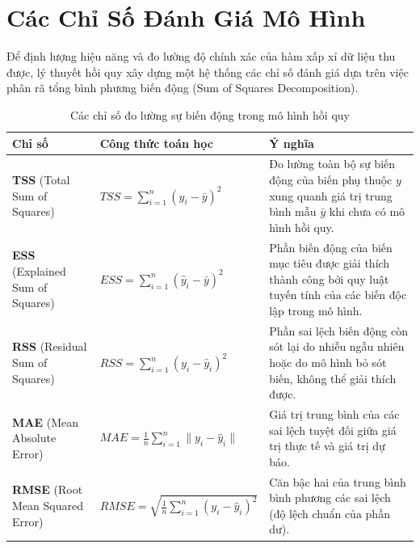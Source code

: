 \section{Các Chỉ Số Đánh Giá Mô Hình}

Để định lượng hiệu năng và đo lường độ chính xác của hàm xấp xỉ dữ liệu thu được, lý thuyết hồi quy xây dựng một hệ thống các chỉ số đánh giá dựa trên việc phân rã tổng bình phương biến động (Sum of Squares Decomposition).


\begin{table}[H]
    \centering
    \renewcommand{\arraystretch}{1.5}
    \setlength{\tabcolsep}{8pt}
    
    \begin{tabular}{|p{3.5cm}|p{5.5cm}|p{6cm}|}
        \hline
        \rowcolor[rgb]{0.8, 0.9, 1.0}
        \textbf{Chỉ số} & \textbf{Công thức toán học} & \textbf{Ý nghĩa} \\ \hline
        
        \textbf{TSS} (Total Sum of Squares) & $TSS = \sum_{i=1}^n (y_i - \bar{y})^2$ & Đo lường toàn bộ sự biến động của biến phụ thuộc $y$ xung quanh giá trị trung bình mẫu $\bar{y}$ khi chưa có mô hình hồi quy. \\ \hline
        
        \textbf{ESS} (Explained Sum of Squares) & $ESS = \sum_{i=1}^n (\hat{y}_i - \bar{y})^2$ & Phần biến động của biến mục tiêu được giải thích thành công bởi quy luật tuyến tính của các biến độc lập trong mô hình. \\ \hline
        
        \textbf{RSS} (Residual Sum of Squares) & $RSS = \sum_{i=1}^n (y_i - \hat{y}_i)^2$ & Phần sai lệch biến động còn sót lại do nhiễu ngẫu nhiên hoặc do mô hình bỏ sót biến, không thể giải thích được. \\ \hline

        \textbf{MAE} (Mean Absolute Error) & $MAE = \frac{1}{n} \sum_{i=1}^n \|y_i - \hat{y}_i\|$ & Giá trị trung bình của các sai lệch tuyệt đối giữa giá trị thực tế và giá trị dự báo. \\ \hline

        \textbf{RMSE} (Root Mean Squared Error) & $RMSE = \sqrt{\frac{1}{n} \sum_{i=1}^n (y_i - \hat{y}_i)^2}$ & Căn bậc hai của trung bình bình phương các sai lệch (độ lệch chuẩn của phần dư). \\ \hline
    \end{tabular}
    \caption{Các chỉ số đo lường sự biến động trong mô hình hồi quy}
\end{table}


